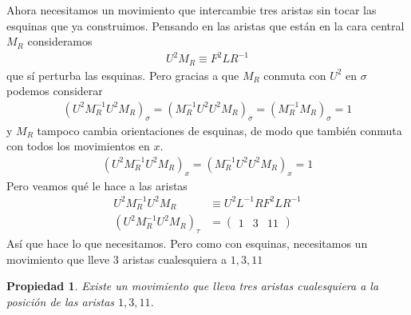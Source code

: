 \documentclass{article}
\newtheorem{propiedad}{Propiedad}[section]
\theoremstyle{definition}
\begin{document}
Ahora necesitamos un movimiento que intercambie tres aristas sin tocar las esquinas que ya construimos. Pensando en las aristas que están en la cara central $M_R$ consideramos
\begin{align*}
    U^2M_R\equiv F^2LR^{-1}
\end{align*}
que sí perturba las esquinas. Pero gracias a que $M_R$ conmuta con $U^2$ en $\sigma$ podemos considerar
\begin{align*}
    (U^2M_R^{-1}U^2M_R)_\sigma=(M_R^{-1}U^2U^2M_R)_\sigma=(M_R^{-1}M_R)_\sigma=1
\end{align*}
y $M_R$ tampoco cambia orientaciones de esquinas, de modo que también conmuta con todos los movimientos en $x$.
\begin{align*}
    (U^2M_R^{-1}U^2M_R)_x=(M_R^{-1}U^2U^2M_R)_x=1
\end{align*}
Pero veamos qué le hace a las aristas
\begin{align*}
    U^2M_R^{-1}U^2M_R        & \equiv U^2L^{-1}RF^2LR^{-1} \\
    (U^2M_R^{-1}U^2M_R)_\tau & =\begin{pmatrix}
                                    1 & 3 & 11
                                \end{pmatrix}
\end{align*}
Así que hace lo que necesitamos. Pero como con esquinas, necesitamos un movimiento que lleve 3 aristas cualesquiera a $1,3,11$
\begin{propiedad}
    Existe un movimiento que lleva tres aristas cualesquiera a la posición de las aristas $1,3,11$.
\end{propiedad}
\end{document}
